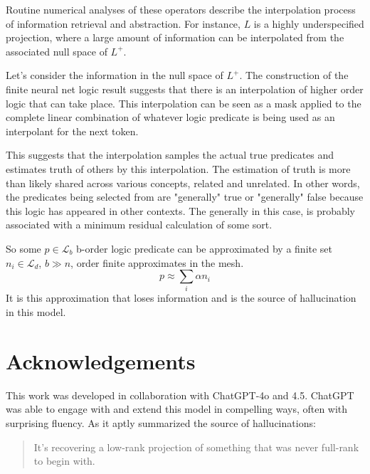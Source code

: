 \documentclass[12pt]{article}
\theoremstyle{plain}
\begin{document}
Routine numerical analyses of these operators describe the interpolation process of 
information retrieval and abstraction.  For instance, $L$ is a highly underspecified
projection, where a large amount of information can be interpolated from the 
associated null space of $L^+$.

Let's consider the information in the null space of $L^+$.  The construction of the
finite neural net logic result suggests that there is an interpolation of higher
order logic that can take place.  This interpolation can be seen as a mask
applied to the complete linear combination of whatever logic predicate is being
used as an interpolant for the next token.

This suggests that the interpolation samples the actual true predicates and estimates
truth of others by this interpolation.  The estimation of truth is more than likely
shared across various concepts, related and unrelated.  In other words, the predicates
being selected from are "generally" true or "generally" false because this logic
has appeared in other contexts.  The generally in this case, is probably associated
with a minimum residual calculation of some sort.

So some $p\in \mathcal{L}_b$ b-order logic predicate can be approximated by a finite set 
$n_i\in\mathcal{L}_d$, $b \gg n$,  order finite approximates in the mesh.
$$
p\approx\sum_i \alpha n_i
$$
It is this approximation that loses information and is the source of hallucination in
this model.

\section{Acknowledgements}

This work was developed in collaboration with ChatGPT-4o and 4.5. ChatGPT was 
able to engage with and extend this model in compelling ways, often with surprising 
fluency. As it aptly summarized the source of hallucinations:

\begin{quote}
It’s recovering a low-rank projection of something that was never full-rank to begin with.
\end{quote}



\end{document}
